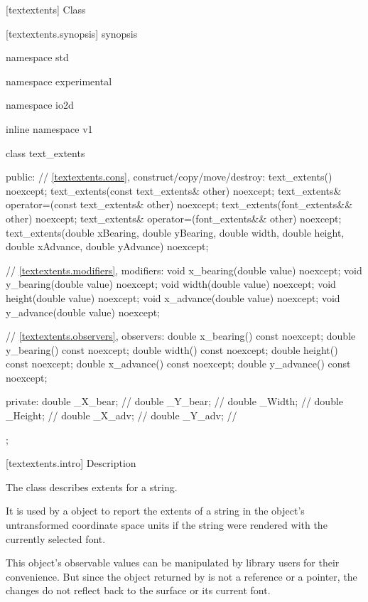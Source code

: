  [textextents] {Class }

 [textextents.synopsis] { synopsis}

\begin{codeblock}
namespace std { namespace experimental { namespace io2d { inline namespace v1 {
  class text_extents {
  public:
    // \ref{textextents.cons}, construct/copy/move/destroy:
    text_extents() noexcept;
    text_extents(const text_extents& other) noexcept;
    text_extents& operator=(const text_extents& other) noexcept;
    text_extents(font_extents&& other) noexcept;
    text_extents& operator=(font_extents&& other) noexcept;
    text_extents(double xBearing, double yBearing, double width,
      double height, double xAdvance, double yAdvance) noexcept;

    // \ref{textextents.modifiers}, modifiers:
    void x_bearing(double value) noexcept;
    void y_bearing(double value) noexcept;
    void width(double value) noexcept;
    void height(double value) noexcept;
    void x_advance(double value) noexcept;
    void y_advance(double value) noexcept;

    // \ref{textextents.observers}, observers:
    double x_bearing() const noexcept;
    double y_bearing() const noexcept;
    double width() const noexcept;
    double height() const noexcept;
    double x_advance() const noexcept;
    double y_advance() const noexcept;

  private:
    double _X_bear; // \expos
    double _Y_bear; // \expos
    double _Width;  // \expos
    double _Height; // \expos
    double _X_adv;  // \expos
    double _Y_adv;  // \expos
  };
} } } }
\end{codeblock}

 [textextents.intro] { Description}

\pnum
{}
The class  describes extents for a string.

\pnum
It is used by a  object to report the extents of a string in the  object's untransformed coordinate space units if the string were rendered with the currently selected font.

\pnum
\enternote
This object's observable values can be manipulated by library users for their convenience. But since the  object returned by  is not a reference or a pointer, the changes do not reflect back to the surface or its current font.
\exitnote

